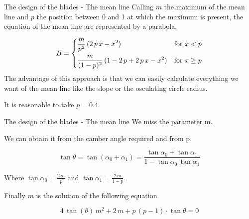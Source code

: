 \documentclass{beamer}
\newcommand{\myspace}[0]{\vspace{0.3cm}}
\newcommand{\highlightgreenC}[1]{\textcolor{chameleongreen3}{#1}}%
\newcommand{\highlightgreenD}[1]{\textcolor{chameleongreen4}{#1}}
\begin{document}
\begin{frame}[t]{The design of the blades - The mean line}
Calling $m$ the maximum of the mean line and $p$ the position between 0 and 1 at which the maximum is present,
the equation of the mean line are represented by a \highlightgreenC{parabola}.

\[
B = 
   \begin{dcases}
     \dfrac{m}{p^2}\,(2\,p\,x - x^2) & \text{for } x < p \\
     \dfrac{m}{(1-p)^2}\,(1 - 2\, p + 2\,p\,x - x^2) & \text{for } x \geq p
   \end{dcases}
\]
The advantage of this approach is that we can easily calculate everything we want of the mean line like the \highlightgreenD{slope} or the \highlightgreenD{osculating circle radius}.

\begin{center}
It is reasonable to take $p = 0.4$.
\end{center}
\end{frame}


\begin{frame}[t]{The design of the blades - The mean line}
We miss the parameter m.

We can obtain it from the camber angle required and from p.

\begin{equation}
\tan\theta = \tan(\alpha_0 + \alpha_1) = \dfrac{\tan\alpha_0 + \tan\alpha_1}{1 - \tan\alpha_0 \, \tan\alpha_1}
\end{equation}

Where $\tan\alpha_0 = \frac{2\,m}{p}$ and $\tan\alpha_1 = \frac{2\,m}{1-p}$.

\myspace
Finally $m$ is the solution of the following equation.

\begin{equation}
4 \, \tan(\theta) \, m^2 + 2 \, m + p\,(p-1) \cdot \tan\theta = 0
\end{equation}

\end{frame}
\end{document}
